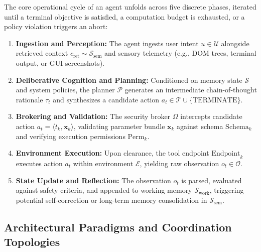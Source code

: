 The core operational cycle of an agent unfolds across five discrete phases, iterated until a terminal objective is satisfied, a computation budget is exhausted, or a policy violation triggers an abort:
\begin{enumerate}
    \item \textbf{Ingestion and Perception:} The agent ingests user intent $u \in \mathcal{U}$ alongside retrieved context $c_{\text{ret}} \sim \mathcal{S}_{\text{sem}}$ and sensory telemetry (e.g., DOM trees, terminal output, or GUI screenshots).
    \item \textbf{Deliberative Cognition and Planning:} Conditioned on memory state $\mathcal{S}$ and system policies, the planner $\mathcal{P}$ generates an intermediate chain-of-thought rationale $\tau_t$ and synthesizes a candidate action $a_t \in \mathcal{T} \cup \{\text{TERMINATE}\}$.
    \item \textbf{Brokering and Validation:} The security broker $\Omega$ intercepts candidate action $a_t = \langle t_k, \mathbf{x}_k \rangle$, validating parameter bundle $\mathbf{x}_k$ against schema $\text{Schema}_k$ and verifying execution permissions $\text{Perm}_k$.
    \item \textbf{Environment Execution:} Upon clearance, the tool endpoint $\text{Endpoint}_k$ executes action $a_t$ within environment $\mathcal{E}$, yielding raw observation $o_t \in \mathcal{O}$.
    \item \textbf{State Update and Reflection:} The observation $o_t$ is parsed, evaluated against safety criteria, and appended to working memory $\mathcal{S}_{\text{work}}$, triggering potential self-correction or long-term memory consolidation in $\mathcal{S}_{\text{sem}}$.
\end{enumerate}

\subsection{Architectural Paradigms and Coordination Topologies}
\label{subsec:topologies}

